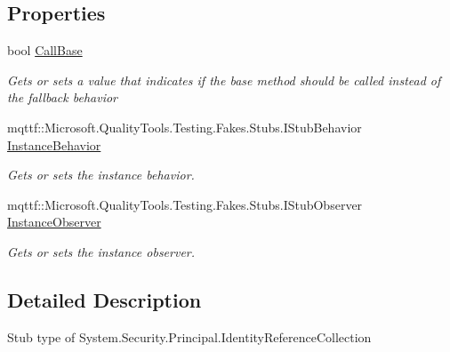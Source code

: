\subsection*{Properties}
\begin{DoxyCompactItemize}
\item 
bool \hyperlink{class_system_1_1_security_1_1_principal_1_1_fakes_1_1_stub_identity_reference_collection_a79581ea8273c676a7ca7b9b44ac4f7f0}{Call\-Base}
\begin{DoxyCompactList}\small\item\em Gets or sets a value that indicates if the base method should be called instead of the fallback behavior\end{DoxyCompactList}\item 
mqttf\-::\-Microsoft.\-Quality\-Tools.\-Testing.\-Fakes.\-Stubs.\-I\-Stub\-Behavior \hyperlink{class_system_1_1_security_1_1_principal_1_1_fakes_1_1_stub_identity_reference_collection_a850de7cd8666cb4eb1172f098e484a8c}{Instance\-Behavior}
\begin{DoxyCompactList}\small\item\em Gets or sets the instance behavior.\end{DoxyCompactList}\item 
mqttf\-::\-Microsoft.\-Quality\-Tools.\-Testing.\-Fakes.\-Stubs.\-I\-Stub\-Observer \hyperlink{class_system_1_1_security_1_1_principal_1_1_fakes_1_1_stub_identity_reference_collection_ae6c621aad2eaa3127802c40044a08f52}{Instance\-Observer}
\begin{DoxyCompactList}\small\item\em Gets or sets the instance observer.\end{DoxyCompactList}\end{DoxyCompactItemize}


\subsection{Detailed Description}
Stub type of System.\-Security.\-Principal.\-Identity\-Reference\-Collection



